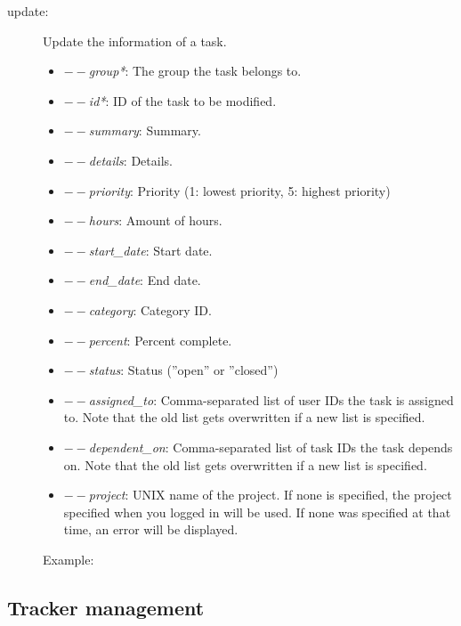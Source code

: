 \documentclass[a4]{article}
\newenvironment{functionlist}{
\begin{description}
}{
\end{description}
}
\newcommand{\function}[1]{\item[#1:] }
\newenvironment{parameterlist}{
\begin{itemize}
    }{
\end{itemize}
}
\newcommand{\parameter}[1]{\item \emph{#1}:}
\newcommand{\projectparameter}{\parameter{$--$project} UNIX name of the project. If none is specified, the project specified when you logged in will
be used. If none was specified at that time, an error will be displayed.}
\begin{document}
\begin{functionlist}
\function{update}
Update the information of a task.
\begin{parameterlist}
\parameter{$--$group*} The group the task belongs to.
\parameter{$--$id*} ID of the task to be modified.
\parameter{$--$summary} Summary.
\parameter{$--$details} Details.
\parameter{$--$priority} Priority (1: lowest priority, 5: highest priority)
\parameter{$--$hours} Amount of hours.
\parameter{$--$start\_date} Start date.
\parameter{$--$end\_date} End date.
\parameter{$--$category} Category ID.
\parameter{$--$percent} Percent complete.
\parameter{$--$status} Status (''open'' or ''closed'')
\parameter{$--$assigned\_to} Comma-separated list of user IDs the task is assigned to. Note that the old list gets overwritten if a 
new list is specified.
\parameter{$--$dependent\_on} Comma-separated list of task IDs the task depends on. Note that the old list gets overwritten if a 
new list is specified.
\projectparameter
\end{parameterlist}
Example:


\end{functionlist}

\subsection{Tracker management}
\end{document}
